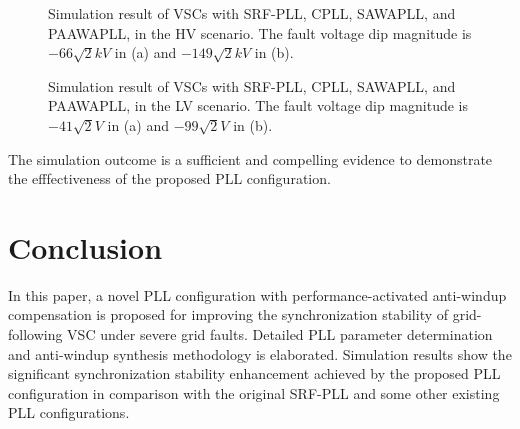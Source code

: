 \documentclass[10pt,final,journal,twoside]{IEEEtran}
\begin{document}
\begin{figure}[!t]
\centering
{}
\caption{Simulation result of VSCs with SRF-PLL, CPLL, SAWAPLL, and PAAWAPLL, in the HV scenario. The fault voltage dip magnitude is $-66\sqrt{2}kV$ in (a) and $-149\sqrt{2}kV$ in (b).}
\label{fig_HVsim}
\end{figure}
\begin{figure}[!t]
\centering
{}
\caption{Simulation result of VSCs with SRF-PLL, CPLL, SAWAPLL, and PAAWAPLL, in the LV scenario. The fault voltage dip magnitude is $-41\sqrt{2}V$ in (a) and $-99\sqrt{2}V$ in (b).}
\label{fig_LVsim}
\end{figure}
The simulation outcome is a sufficient and compelling evidence to demonstrate the efffectiveness of the proposed PLL configuration.
\section{Conclusion}\label{sec:conclusion}
In this paper, a novel PLL configuration with performance-activated anti-windup compensation is proposed for improving the synchronization stability of grid-following VSC under severe grid faults. Detailed PLL
parameter determination and anti-windup synthesis methodology is elaborated. Simulation results show the significant synchronization stability enhancement achieved by the proposed PLL configuration in comparison
with the original SRF-PLL and some other existing PLL configurations.





\end{document}
